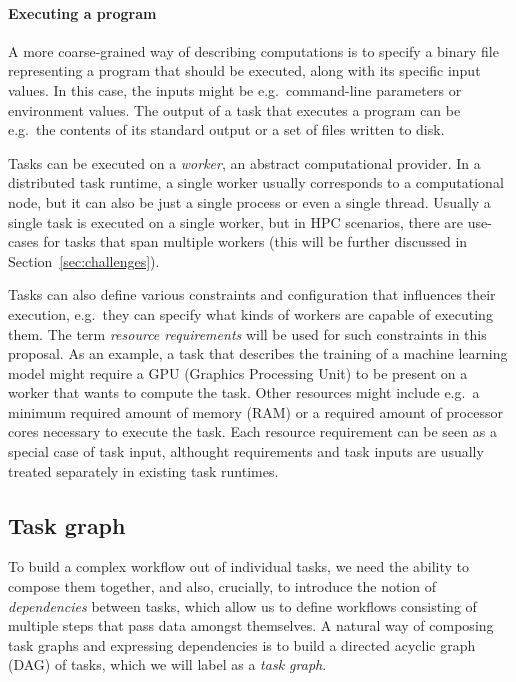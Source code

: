 \paragraph{Executing a program} A more coarse-grained way of describing computations is to specify
a binary file representing a program that should be executed, along with its specific input values.
In this case, the inputs might be e.g.\ command-line parameters or environment values. The
output of a task that executes a program can be e.g.\ the contents of its standard output or a set
of files written to disk.

\vspace{3mm}Tasks can be executed on a \emph{worker}, an abstract computational provider. In a
distributed task runtime, a single worker usually corresponds to a computational node, but
it can also be just a single process or even a single thread. Usually a single
task is executed on a single worker, but in HPC scenarios, there are use-cases for tasks that
span multiple workers (this will be further discussed in Section~\ref{sec:challenges}).

Tasks can also define various constraints and configuration that influences their execution,
e.g.\ they can specify what kinds of workers are capable of executing them.
The term \emph{resource requirements} will be used for such constraints in this proposal. As an
example, a task that describes the training of a machine learning model might require a GPU
(Graphics Processing Unit) to be present on a worker that wants to compute the task. Other
resources might include e.g.\ a minimum required amount of memory (RAM) or a required amount of
processor cores necessary to execute the task. Each resource requirement can be seen as a
special case of task input, althought requirements and task inputs are usually treated
separately in existing task runtimes.

\subsection{Task graph}
To build a complex workflow out of individual tasks, we need the ability to compose them together,
and also, crucially, to introduce the notion of \emph{dependencies} between tasks, which allow us
to define workflows consisting of multiple steps that pass data amongst themselves.
A natural way of composing task graphs and expressing dependencies is to build a directed acyclic
graph (DAG) of tasks, which we will label as a \emph{task graph}.

